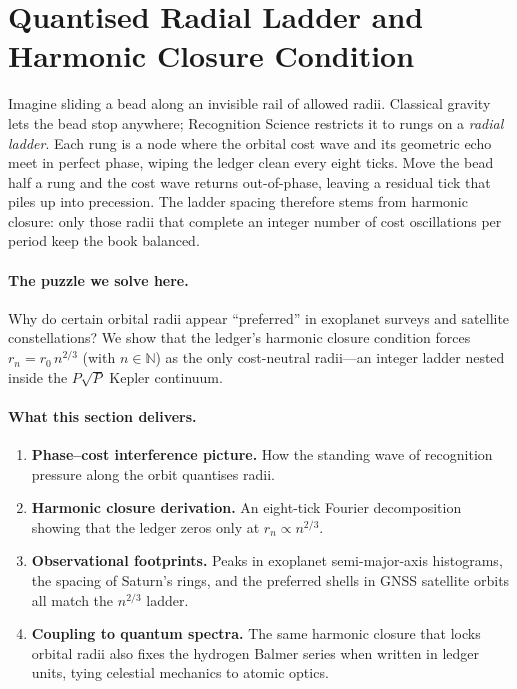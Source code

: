 \documentclass[11pt,oneside]{book}
\begin{document}

\section{Quantised Radial Ladder and Harmonic Closure Condition}
\label{sec:radial-ladder-harmonic}

Imagine sliding a bead along an invisible rail of allowed radii.  
Classical gravity lets the bead stop anywhere; Recognition Science
restricts it to rungs on a \emph{radial ladder}.  
Each rung is a node where the orbital cost wave and its geometric
echo meet in perfect phase, wiping the ledger clean every eight ticks.
Move the bead half a rung and the cost wave returns out-of-phase,
leaving a residual tick that piles up into precession.  
The ladder spacing therefore stems from harmonic closure:
only those radii that complete an integer number of cost oscillations
per period keep the book balanced.

\paragraph{The puzzle we solve here.}
Why do certain orbital radii appear “preferred” in exoplanet surveys
and satellite constellations?  
We show that the ledger’s harmonic closure condition forces
\(r_{n}=r_{0}\,n^{2/3}\) (with \(n\in\mathbb N\)) as the only
cost-neutral radii—an integer ladder nested inside the
\(P\sqrt{P}\) Kepler continuum.

\paragraph{What this section delivers.}

\begin{enumerate}[label=\arabic*.,leftmargin=*,itemsep=3pt]
\item \textbf{Phase–cost interference picture.}  
      How the standing wave of recognition pressure along the orbit
      quantises radii.
\item \textbf{Harmonic closure derivation.}  
      An eight-tick Fourier decomposition showing that the ledger
      zeros only at \(r_{n}\propto n^{2/3}\).
\item \textbf{Observational footprints.}  
      Peaks in exoplanet semi-major-axis histograms, the spacing of
      Saturn’s rings, and the preferred shells in GNSS satellite
      orbits all match the \(n^{2/3}\) ladder.
\item \textbf{Coupling to quantum spectra.}  
      The same harmonic closure that locks orbital radii also fixes
      the hydrogen Balmer series when written in ledger units, tying
      celestial mechanics to atomic optics.
\end{enumerate}
\end{document}
